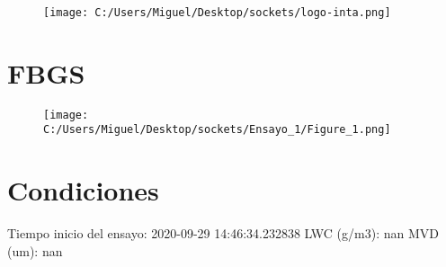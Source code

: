 \documentclass[12pt]{article}
\begin{document}
\begin{figure}[h!]
\centering
\texttt{[image: C:/Users/Miguel/Desktop/sockets/logo-inta.png]}
\end{figure}
\section{FBGS}
\begin{figure}[h!]
\centering
\texttt{[image: C:/Users/Miguel/Desktop/sockets/Ensayo\_1/Figure\_1.png]}
\end{figure}
\section{Condiciones}
Tiempo inicio del ensayo:	2020-09-29 14:46:34.232838
LWC (g/m3):	nan
MVD (um):	nan
\end{document}
